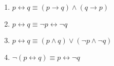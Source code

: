 \documentclass[a4paper,8pt]{article}
\begin{document}
\begin{outline}
    \begin{enumerate}
      \item \(p \leftrightarrow q \equiv (p \rightarrow q) \wedge (q \rightarrow p)\)
      \item \(p \leftrightarrow q \equiv \neg p \leftrightarrow \neg q\)
      \item \(p \leftrightarrow q \equiv (p \wedge q) \vee (\neg p \wedge \neg q)\)
      \item \(\neg(p \leftrightarrow q) \equiv p \leftrightarrow \neg q\)
    \end{enumerate}

\end{outline}
\end{document}
